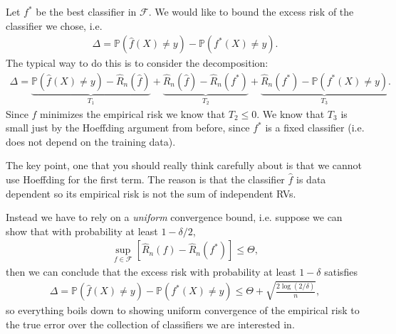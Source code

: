 \documentclass[twoside,12pt]{article}
\begin{document}
Let $f^*$ be the best classifier in $\mathcal{F}$. 
We would like to bound the excess risk of the classifier we chose, i.e.
\begin{align*}
\Delta = \mathbb{P}(\widehat{f}(X) \neq y) - \mathbb{P}(f^*(X) \neq y).
\end{align*}
The typical way to do this is to consider the decomposition:
\begin{align*}
\Delta = \underbrace{\mathbb{P}(\widehat{f}(X) \neq y) - \widehat{R}_n(\widehat{f}) }_{T_1}
+\underbrace{ \widehat{R}_n(\widehat{f}) - \widehat{R}_n(f^*)}_{T_2} +  \underbrace{\widehat{R}_n(f^*)-\mathbb{P}(f^*(X) \neq y)}_{T_3}.
\end{align*}
Since $\widehat{f}$ minimizes the empirical risk we know that $T_2 \leq 0$. We know that $T_3$ is small just by the Hoeffding argument from before, since $f^*$ is a fixed classifier (i.e. does not depend on the training data). 

The key point, one that you should really think carefully about is that we cannot use Hoeffding for the first term. The reason is that the classifier $\widehat{f}$ is data dependent so its empirical risk is not the sum of independent RVs.

Instead we have to rely on a \emph{uniform} convergence bound, i.e. suppose we can show that with probability at least $1 - \delta/2$,
\begin{align*}
\sup_{f \in \mathcal{F}} \left[ \widehat{R}_n(f) - \widehat{R}_n(f^*) \right]\leq \Theta,
\end{align*}
then we can conclude that the excess risk with probability at least $1 - \delta$ satisfies 
\begin{align*}
\Delta = \mathbb{P}(\widehat{f}(X) \neq y) - \mathbb{P}(f^*(X) \neq y) \leq \Theta + \sqrt{\frac{2\log(2/\delta)}{n}},
\end{align*}
so everything boils down to showing uniform convergence of the empirical risk to the true error over the collection of classifiers we are interested in.
\end{document}
